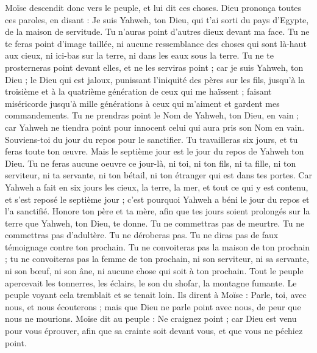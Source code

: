 \begin{multicols}{2}
Moïse descendit donc vers le peuple, et lui dit ces choses.
\VerseOne{}Dieu prononça toutes ces paroles, en disant :
Je suis Yahweh, ton Dieu, qui t'ai sorti du pays d'Egypte, de la maison de servitude.
Tu n'auras point d'autres dieux devant ma face.
Tu ne te feras point d'image taillée, ni aucune ressemblance des choses qui sont là-haut aux cieux, ni ici-bas sur la terre, ni dans les eaux sous la terre.
Tu ne te prosterneras point devant elles, et ne les serviras point ; car je suis Yahweh, ton Dieu ; le Dieu qui est jaloux, punissant l'iniquité des pères sur les fils, jusqu'à la troisième et à la quatrième génération de ceux qui me haïssent ;
faisant miséricorde jusqu’à mille générations à ceux qui m'aiment et gardent mes commandements.
Tu ne prendras point le Nom de Yahweh, ton Dieu, en vain ; car Yahweh ne tiendra point pour innocent celui qui aura pris son Nom en vain.
Souviens-toi du jour du repos pour le sanctifier.
Tu travailleras six jours, et tu feras toute ton œuvre.
Mais le septième jour est le jour du repos de Yahweh ton Dieu. Tu ne feras aucune oeuvre ce jour-là, ni toi, ni ton fils, ni ta fille, ni ton serviteur, ni ta servante, ni ton bétail, ni ton étranger qui est dans tes portes.
Car Yahweh a fait en six jours les cieux, la terre, la mer, et tout ce qui y est contenu, et s'est reposé le septième jour ; c'est pourquoi Yahweh a béni le jour du repos et l’a sanctifié.
Honore ton père et ta mère, afin que tes jours soient prolongés sur la terre que Yahweh, ton Dieu, te donne.
Tu ne commettras pas de meurtre.
Tu ne commettras pas d’adultère.
Tu ne déroberas pas.
Tu ne diras pas de faux témoignage contre ton prochain.
Tu ne convoiteras pas la maison de ton prochain ; tu ne convoiteras pas la femme de ton prochain, ni son serviteur, ni sa servante, ni son bœuf, ni son âne, ni aucune chose qui soit à ton prochain.
Tout le peuple apercevait les tonnerres, les éclairs, le son du shofar, la montagne fumante. Le peuple voyant cela tremblait et se tenait loin.
Ils dirent à Moïse : Parle, toi, avec nous, et nous écouterons ; mais que Dieu ne parle point avec nous, de peur que nous ne mourions.
Moïse dit au peuple : Ne craignez point ; car Dieu est venu pour vous éprouver, afin que sa crainte soit devant vous, et que vous ne péchiez point.

\end{multicols}
